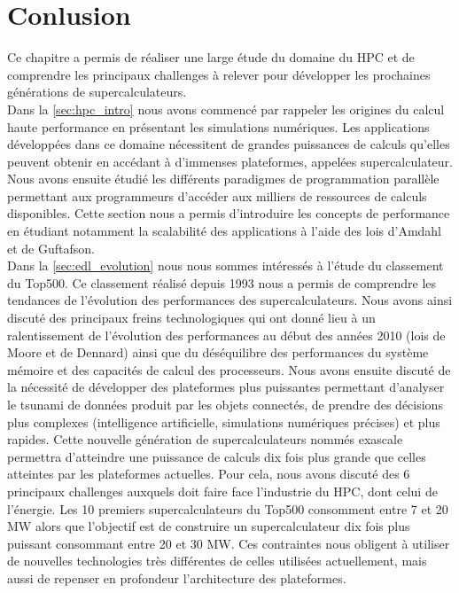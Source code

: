 \section{Conlusion}\label{sec:conclusion-hpc}


    Ce chapitre a permis de réaliser une large étude du domaine du HPC et de comprendre les principaux challenges à relever pour développer les prochaines générations de supercalculateurs.\\
    
    
    Dans la \autoref{sec:hpc_intro} nous avons commencé par rappeler les origines du calcul haute performance en présentant les simulations numériques. Les applications développées dans ce domaine nécessitent de grandes puissances de calculs qu'elles peuvent obtenir en accédant à d'immenses plateformes, appelées supercalculateur. Nous avons ensuite étudié les différents paradigmes de programmation parallèle permettant aux programmeurs d'accéder aux milliers de ressources de calculs disponibles. Cette section nous a permis d'introduire les concepts de performance en étudiant notamment la scalabilité des applications à l'aide des lois d'Amdahl et de Guftafson.\\
    
    
    Dans la \autoref{sec:edl_evolution} nous nous sommes intéressés à l'étude du classement du Top500. Ce classement réalisé depuis 1993 nous a permis de comprendre les tendances de l'évolution des performances des supercalculateurs. Nous avons ainsi discuté des principaux freins technologiques qui ont donné lieu à un ralentissement de l'évolution des performances au début des années 2010 (lois de Moore et de Dennard) ainsi que du déséquilibre des performances du système mémoire et des capacités de calcul des processeurs. Nous avons ensuite discuté de la nécessité de développer des plateformes plus puissantes permettant d'analyser le tsunami de données produit par les objets connectés, de prendre des décisions plus complexes (intelligence artificielle, simulations numériques précises) et plus rapides. Cette nouvelle génération de supercalculateurs nommés exascale permettra d'atteindre une puissance de calculs dix fois plus grande que celles atteintes par les plateformes actuelles. Pour cela, nous avons discuté des 6 principaux challenges auxquels doit faire face l'industrie du HPC, dont celui de l’énergie. Les 10 premiers supercalculateurs du Top500 consomment entre 7 et 20 MW alors que l’objectif est de construire un supercalculateur dix fois plus puissant consommant entre 20 et 30 MW. Ces contraintes nous obligent à utiliser de nouvelles technologies très différentes de celles utilisées actuellement, mais aussi de repenser en profondeur l'architecture des plateformes.\\
    
